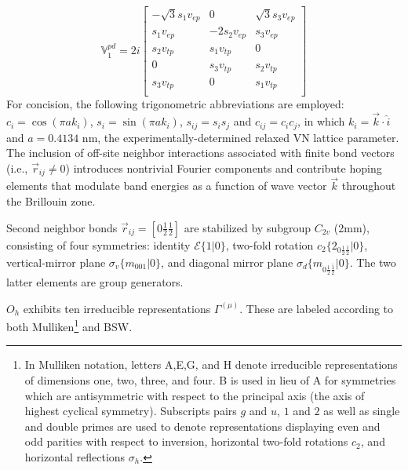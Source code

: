 \documentclass[twocolumn,showpacs,preprintnumbers,superscriptaddress,prb,floatfix,aps,10pt]{revtex4-1}
\newcommand*{\id}{\mathcal{E}}
\newcommand*{\bondvec}{\vec{r}_{ij}}
\newcommand{\seitz}[2]{\{#1|#2\}}
\begin{document}
%
\begin{equation}
\mathbb{V}_1^{pd} =  2i
\begin{bmatrix}
-\sqrt{3} s_1 v_{ep} & 0            & \sqrt{3} s_3 v_{ep}  \\ %
 s_1 v_{ep}          &-2 s_2 v_{ep} &  s_3 v_{ep}          \\ %
 s_2 v_{tp}          &  s_1 v_{tp}  & 0                    \\
0                    &  s_3 v_{tp}  &  s_2 v_{tp}          \\
 s_3 v_{tp}          & 0            &  s_1 v_{tp}          \\
\end{bmatrix}
\end{equation}
%
For concision, the following trigonometric abbreviations are employed: $c_i = \cos(\pi a k_i)$, $s_i = \sin(\pi a k_i)$, $s_{ij} = s_i s_j$ and $c_{ij} = c_i c_j$, in which $k_i = \vec{k}\cdot\hat{i}$ and $a = 0.4134$ nm, the experimentally-determined relaxed VN lattice parameter. The inclusion of off-site neighbor interactions associated with finite bond vectors (i.e., $\vec{r}_{ij} \neq 0$) introduces nontrivial Fourier components and contribute hoping elements that modulate band energies as a function of wave vector $\vec{k}$ throughout the Brillouin zone. 


Second neighbor bonds $\bondvec = [0\frac{1}{2}\frac{1}{2}]$ are stabilized by subgroup $C_{2v}$ (2mm), consisting of four symmetries: identity $\id \seitz{1}{0}$, two-fold rotation $c_2 \seitz{ 2_{0\frac{1}{2}\frac{1}{2}} }{0}$, vertical-mirror plane $\sigma_v \seitz{m_{001}}{0}$, and diagonal mirror plane $\sigma_d \seitz{m_{0\frac{1}{2}\bar{\frac{1}{2}}}}{0}$. The two latter elements are group generators.




$O_h$ exhibits ten irreducible representations $\Gamma^{(\mu)}$. These are labeled according to both Mulliken\footnote{In Mulliken notation, letters A,E,G, and H denote irreducible representations of dimensions one, two, three, and four. B is used in lieu of A for symmetries which are antisymmetric with respect to the principal axis (the axis of highest cyclical symmetry). Subscripts pairs $g$ and $u$, $1$ and $2$ as well as single and double primes are used to denote representations displaying even and odd parities with respect to inversion, horizontal two-fold rotations $c_2$, and horizontal reflections $\sigma_h$.} and BSW.
\end{document}
